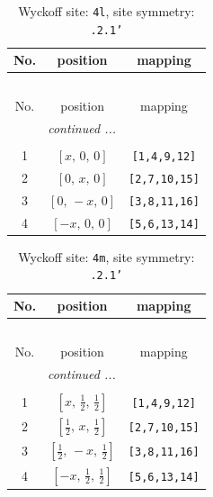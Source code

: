 \documentclass[fleqn,8pt]{jsarticle}
\begin{document}
\renewcommand{\arraystretch}{1.2}
\begin{longtable}{ccc}
\caption{Wyckoff site: {\tt 4l}, site symmetry: {\tt .2.1'}}
 \\
 \hline \hline
No. & position & mapping \\ \hline \endfirsthead

\multicolumn{2}{l}{\tablename\ \thetable{}} \\
 \hline \hline
No. & position & mapping \\ \hline \endhead

 \hline \hline
\multicolumn{2}{r}{\footnotesize\it continued ...} \\ \endfoot

 \hline \hline
\multicolumn{2}{r}{} \\ \endlastfoot

1 & $\left[ x,\, 0,\, 0 \right]$ & {\tt [1,4,9,12]} \\ \hline
2 & $\left[ 0,\, x,\, 0 \right]$ & {\tt [2,7,10,15]} \\ \hline
3 & $\left[ 0,\, - x,\, 0 \right]$ & {\tt [3,8,11,16]} \\ \hline
4 & $\left[ - x,\, 0,\, 0 \right]$ & {\tt [5,6,13,14]} \\
\end{longtable}
\renewcommand{\arraystretch}{1.2}
\begin{longtable}{ccc}
\caption{Wyckoff site: {\tt 4m}, site symmetry: {\tt .2.1'}}
 \\
 \hline \hline
No. & position & mapping \\ \hline \endfirsthead

\multicolumn{2}{l}{\tablename\ \thetable{}} \\
 \hline \hline
No. & position & mapping \\ \hline \endhead

 \hline \hline
\multicolumn{2}{r}{\footnotesize\it continued ...} \\ \endfoot

 \hline \hline
\multicolumn{2}{r}{} \\ \endlastfoot

1 & $\left[ x,\, \frac{1}{2},\, \frac{1}{2} \right]$ & {\tt [1,4,9,12]} \\ \hline
2 & $\left[ \frac{1}{2},\, x,\, \frac{1}{2} \right]$ & {\tt [2,7,10,15]} \\ \hline
3 & $\left[ \frac{1}{2},\, - x,\, \frac{1}{2} \right]$ & {\tt [3,8,11,16]} \\ \hline
4 & $\left[ - x,\, \frac{1}{2},\, \frac{1}{2} \right]$ & {\tt [5,6,13,14]} \\
\end{longtable}
\end{document}
